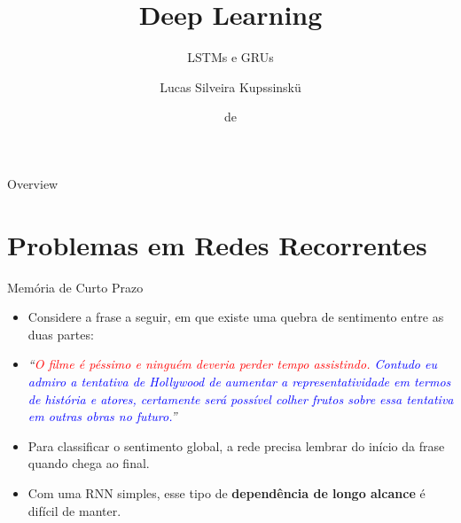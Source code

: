 \documentclass[aspectratio=169,xcolor=dvipsnames]{beamer}
\title{Deep Learning}
\subtitle{LSTMs e GRUs}
\author{Lucas Silveira Kupssinskü}
\institute
{
    Machine Learning Theory and Applications Laboratory \\
    PUCRS
}
\date{\mespor de \the\year}
\begin{document}
\begin{frame}
    \titlepage
\end{frame}

\begin{frame}{Overview}
    \tableofcontents
\end{frame}

\section{Problemas em Redes Recorrentes}

\begin{frame}{Memória de Curto Prazo}
\begin{itemize}
    \item Considere a frase a seguir, em que existe uma quebra de sentimento entre as duas partes:
    \item \textit{``\textcolor{red}{O filme é péssimo e ninguém deveria perder tempo assistindo.} \textcolor{blue}{Contudo eu admiro a tentativa de Hollywood de aumentar a representatividade em termos de história e atores, certamente será possível colher frutos sobre essa tentativa em outras obras no futuro.}''}
    \item Para classificar o sentimento global, a rede precisa lembrar do início da frase quando chega ao final.
    \item Com uma RNN simples, esse tipo de \textbf{dependência de longo alcance} é difícil de manter.
\end{itemize}
\end{frame}
\end{document}
